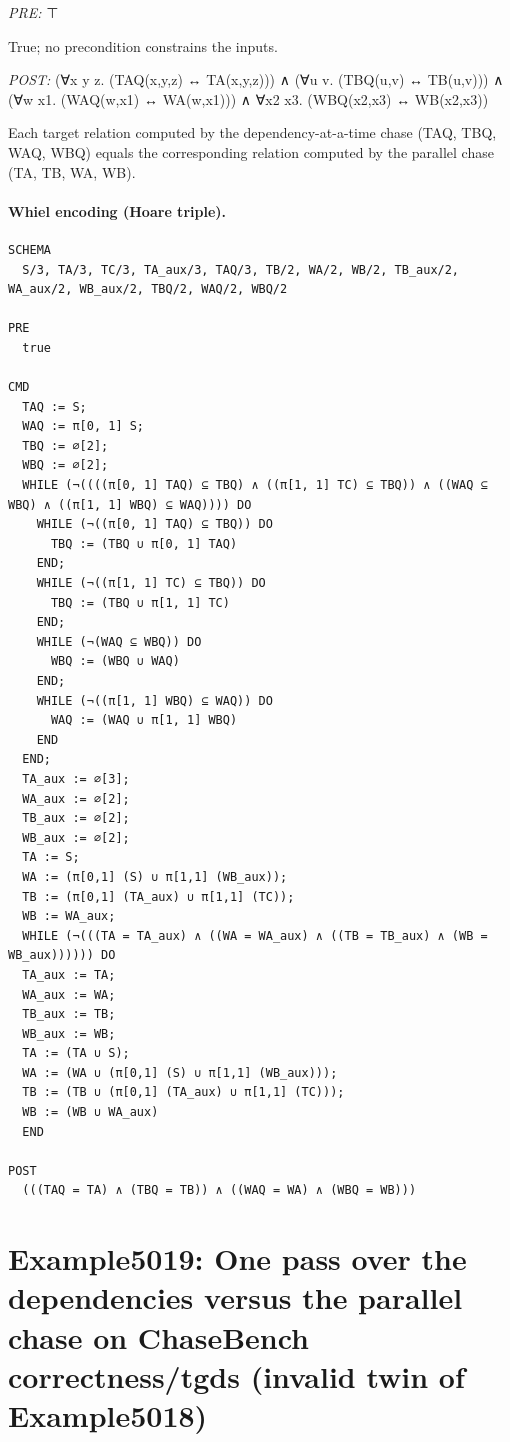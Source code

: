 \documentclass[10pt]{article}
\begin{document}
\textit{PRE:} ⊤\par True; no precondition constrains the inputs.

\textit{POST:} (∀x y z. (TAQ(x,y,z) ↔ TA(x,y,z))) ∧ (∀u v. (TBQ(u,v) ↔ TB(u,v))) ∧ (∀w x1. (WAQ(w,x1) ↔ WA(w,x1))) ∧ ∀x2 x3. (WBQ(x2,x3) ↔ WB(x2,x3))\par Each target relation computed by the dependency-at-a-time chase (TAQ, TBQ, WAQ, WBQ) equals the corresponding relation computed by the parallel chase (TA, TB, WA, WB).

\paragraph{Whiel encoding (Hoare triple).}

\begin{Verbatim}[fontsize=\tiny,breaklines=true,breakanywhere=true,frame=single,framesep=1.5mm]
SCHEMA
  S/3, TA/3, TC/3, TA_aux/3, TAQ/3, TB/2, WA/2, WB/2, TB_aux/2, WA_aux/2, WB_aux/2, TBQ/2, WAQ/2, WBQ/2

PRE
  true 

CMD
  TAQ := S;
  WAQ := π[0, 1] S;
  TBQ := ∅[2];
  WBQ := ∅[2];
  WHILE (¬((((π[0, 1] TAQ) ⊆ TBQ) ∧ ((π[1, 1] TC) ⊆ TBQ)) ∧ ((WAQ ⊆ WBQ) ∧ ((π[1, 1] WBQ) ⊆ WAQ)))) DO
    WHILE (¬((π[0, 1] TAQ) ⊆ TBQ)) DO
      TBQ := (TBQ ∪ π[0, 1] TAQ)
    END;
    WHILE (¬((π[1, 1] TC) ⊆ TBQ)) DO
      TBQ := (TBQ ∪ π[1, 1] TC)
    END;
    WHILE (¬(WAQ ⊆ WBQ)) DO
      WBQ := (WBQ ∪ WAQ)
    END;
    WHILE (¬((π[1, 1] WBQ) ⊆ WAQ)) DO
      WAQ := (WAQ ∪ π[1, 1] WBQ)
    END
  END;
  TA_aux := ∅[3];
  WA_aux := ∅[2];
  TB_aux := ∅[2];
  WB_aux := ∅[2];
  TA := S;
  WA := (π[0,1] (S) ∪ π[1,1] (WB_aux));
  TB := (π[0,1] (TA_aux) ∪ π[1,1] (TC));
  WB := WA_aux;
  WHILE (¬(((TA = TA_aux) ∧ ((WA = WA_aux) ∧ ((TB = TB_aux) ∧ (WB = WB_aux)))))) DO
  TA_aux := TA;
  WA_aux := WA;
  TB_aux := TB;
  WB_aux := WB;
  TA := (TA ∪ S);
  WA := (WA ∪ (π[0,1] (S) ∪ π[1,1] (WB_aux)));
  TB := (TB ∪ (π[0,1] (TA_aux) ∪ π[1,1] (TC)));
  WB := (WB ∪ WA_aux)
  END

POST
  (((TAQ = TA) ∧ (TBQ = TB)) ∧ ((WAQ = WA) ∧ (WBQ = WB)))
\end{Verbatim}

\Needspace{0.45\textheight}

\section{Example5019: One pass over the dependencies versus the parallel chase on ChaseBench correctness/tgds (invalid twin of Example5018)}\label{case:Example5019}
\end{document}
